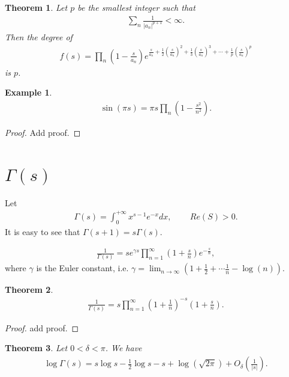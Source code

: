 \documentclass[a4paper,10pt]{amsart}
\newtheorem{example}{Example}[section]
\newtheorem{theorem}{Theorem}[section]
\begin{document}
\begin{theorem}
   Let $p$ be the smallest integer such that
   \begin{align*}
       \sum_{n} \frac{1}{|a_{n}|^{p+1}} < \infty. 
   \end{align*}
   Then the degree of
\begin{align*}
        f(s) = \prod_{n}(1-\frac{s}{a_{n}}) 
        e^{\frac{s}{a_{n}}
           +\frac{1}{2}(\frac{s}{a_{n}})^{2} 
            +\frac{1}{3}(\frac{s}{a_{n}})^{3} + \cdots
        +\frac{1}{p}(\frac{s}{a_{n}})^{p}}
    \end{align*}
      is $p$.
\end{theorem}

\begin{example}
   \begin{align*}
       \sin(\pi s) = \pi s \prod_{n}(1-\frac{s^2}{n^2}). 
   \end{align*} 
\end{example}

\begin{proof}
   Add proof. 
\end{proof}


\section{$\Gamma(s)$}
Let 
\begin{align*}
    \Gamma(s) = \int_{0}^{+\infty} x^{s-1}e^{-x} dx \mbox{, } \qquad 
    Re(S) > 0. 
\end{align*}
It is easy to see that $\Gamma(s+1) = s\Gamma(s)$.

\begin{align*}
    \frac{1}{\Gamma(s)} = se^{\gamma s}\prod_{n=1}^{\infty}(1+\frac{s}{n})
    e^{-\frac{s}{n}},
\end{align*}
where $\gamma$ is the Euler constant, i.e. $\gamma = \lim_{n \rightarrow
\infty} (1 + \frac{1}{2} + \cdots \frac{1}{n} - \log(n))$.

\begin{theorem}
   \begin{align*}
       \frac{1}{\Gamma(s)} = s \prod_{n=1}^{\infty}(1+\frac{1}{n})^{-s}
       (1+ \frac{s}{n}). 
   \end{align*} 
\end{theorem}

\begin{proof}
   add proof. 
\end{proof}


\begin{theorem}
   Let $0 < \delta < \pi$. We have
   \begin{align*}
       \log \Gamma(s) = s \log s - \frac{1}{2}\log s - s 
       + \log (\sqrt{2\pi}) + O_{\delta}(\frac{1}{|s|}). 
   \end{align*}
\end{theorem}
\end{document}
